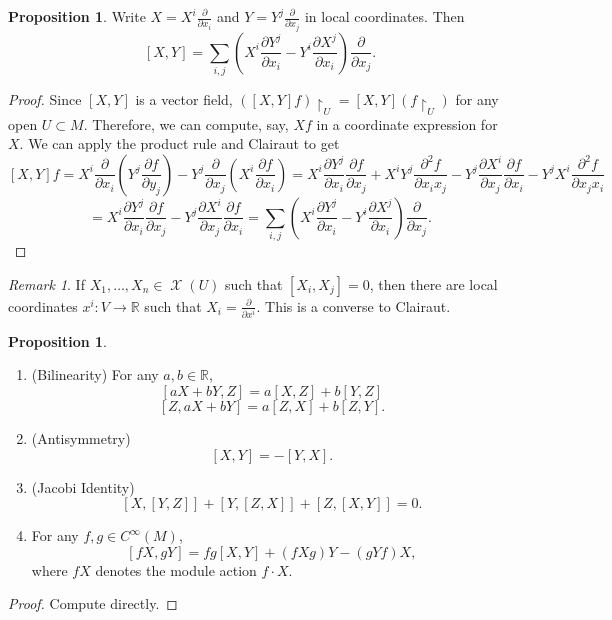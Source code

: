 \documentclass[10pt,letterpaper,cm]{nupset}
\theoremstyle{definition}
\theoremstyle{theorem}
\newtheorem{prop}[definition]{Proposition}
\theoremstyle{remark}
\newtheorem{remark}[definition]{Remark}
\newcommand{\R}{\mathbb R}
\newcommand{\1}{\mathbf{1}}
\newcommand{\0}{\vec 0}
\DeclareMathOperator{\vf}{\mathscr{X}}
\begin{document}
\begin{prop}
Write $X = X^i\frac{\partial}{\partial{x_i}}$ and $Y = Y^j \frac{\partial}{\partial{x_j}}$ in local coordinates. Then $$[X, Y] = \sum_{i, j}(X^i \frac{\partial{Y^j}}{\partial{x_i}} - Y^i\frac{\partial{X^j}}{\partial{x_i}})\frac{\partial}{\partial{x_j}}.$$
\end{prop}
\begin{proof}
Since $[X, Y]$ is a vector field, $([X, Y]f) \restriction_U = [X, Y](f\restriction_U)$ for any open $U \subset M$. Therefore, we can compute, say, $Xf$ in a coordinate expression for $X$.  We can apply the product rule and Clairaut to get
$$[X, Y]f = X^i \frac{\partial}{\partial{x_i}} (Y^j \frac{\partial{f}}{\partial{y_j}}) - Y^j \frac{\partial}{\partial{x_j}} (X^i \frac{\partial{f}}{\partial{x_i}}) =  X^i \frac{\partial{Y^j}}{\partial{x_i}}\frac{\partial{f}}{\partial{x_j}} + X^i Y^j \frac{\partial^2{f}}{\partial{x_i}{x_j}} - Y^j \frac{\partial{X^i}}{\partial{x_j}}\frac{\partial{f}}{\partial{x_i}} - Y^j X^i \frac{\partial^2{f}}{\partial{x_j}{x_i}}$$ $$= X^i \frac{\partial{Y^j}}{\partial{x_i}}\frac{\partial{f}}{\partial{x_j}} -  Y^j \frac{\partial{X^i}}{\partial{x_j}}\frac{\partial{f}}{\partial{x_i}} = \sum_{i, j}(X^i \frac{\partial{Y^j}}{\partial{x_i}} - Y^i\frac{\partial{X^j}}{\partial{x_i}})\frac{\partial}{\partial{x_j}}.$$
\end{proof}

\begin{remark}
If $X_1, \ldots, X_n \in \vf(U)$ such that $[X_i, X_j]= 0$, then there are local coordinates $x^i : V \to \R$ such that $X_i  =\frac{\partial}{\partial{x^i}}$. This is a converse to Clairaut.
\end{remark}

\begin{prop} $ $
\begin{enumerate}
\item (Bilinearity) For any $a,b \in \R$, $$[aX + bY, Z] = a[X, Z] + b[Y, Z]$$ $$[Z, aX + bY] = a[Z, X] + b[Z, Y]. $$ 
\item (Antisymmetry) $$[X, Y] = -[Y,X].$$
\item (Jacobi Identity) $$[X, [Y, Z]]+ [Y, [Z, X]] + [Z, [X, Y]] =0  . $$
\item For any $f, g \in C^{\infty}(M)$, $$[fX, gY] = fg[X, Y] + (fXg)Y - (gYf)X, $$ where $fX$ denotes the module action $f \cdot X$.
\end{enumerate}
\end{prop}
\begin{proof} Compute directly. \end{proof}
\end{document}
